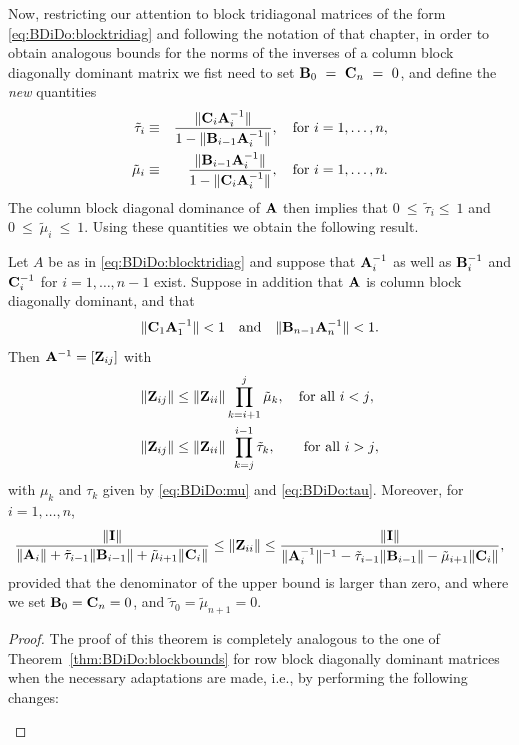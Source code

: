 \begin{subappendices}
Now, restricting our attention to block tridiagonal matrices of the form
\eqref{eq:BDiDo:blocktridiag} and following the notation of that chapter, in
order to obtain analogous bounds for the norms of the inverses of a column
block diagonally dominant matrix we fist need to set $\mathbf{B}_0~=~\mathbf{C}_n~=~0$, and
define the \emph{new} quantities
%
\begin{eqnarray*}
\tilde{\tau}_i   &\equiv& \frac{\|\mathbf{C}_i\mathbf{A}_i^{-1}\|}{1-\|\mathbf{B}_{i-1}\mathbf{A}_i^{-1}\|},
\quad \text{for $i=1,\ldots,n$}, \\
\tilde{\mu}_i &\equiv& \frac{\|\mathbf{B}_{i-1}\mathbf{A}_i^{-1}\|}{1-\|\mathbf{C}_{i}\mathbf{A}_i^{-1}\|},
\quad \text{for $i=1,\ldots,n$}.
\end{eqnarray*}
%
The column block diagonal dominance of $\mathbf{A}$ then implies that
$0~\leq ~\tilde{\tau}_i\leq~1$ and $0~\leq~\tilde{\mu}_i~\leq~1$.
Using these quantities we obtain the following result.
%
\begin{thm}
Let $A$  be as in \eqref{eq:BDiDo:blocktridiag} and suppose that
$\mathbf{A}_i^{-1}$ as well as $\mathbf{B}_i^{-1}$ and $\mathbf{C}_i^{-1}$ for $i=1,\ldots,n-1$ exist.
Suppose in addition that $\mathbf{A}$ is column block diagonally dominant, and that
%
\begin{equation}\label{eq:app:blktridom_b}
\|\mathbf{C}_1\mathbf{A}_1^{-1}\|<1 \quad \mbox{and} \quad \|\mathbf{B}_{n-1}\mathbf{A}_n^{-1}\|<1.
\end{equation}
%
Then $\mathbf{A}^{-1}=[\mathbf{Z}_{ij}]$ with
%
\begin{align}
\|\mathbf{Z}_{ij}\| & \leq  \|\mathbf{Z}_{ii}\| \prod_{k=i+1}^{j}\tilde{\mu}_k,
\quad\text{for all $i<j$}, \label{eq:app:offdiagbound1}\\
\|\mathbf{Z}_{ij}\| & \leq  \|\mathbf{Z}_{ii}\|\;\,\prod_{k=j}^{i-1}\tilde{\tau}_k,
\qquad\text{for all $i>j$},\label{eq:app:offdiagbound2}
\end{align}
%
with $\mu_k$ and $\tau_k$ given by \eqref{eq:BDiDo:mu} and \eqref{eq:BDiDo:tau}. Moreover, for $i=1,\dots,n$,
%
\begin{equation}\label{eq:app:diagbounds}
\frac{\|\mathbf{I}\|}
{\|\mathbf{A}_i\|+\tilde{\tau}_{i-1}\|\mathbf{B}_{i-1}\|+\tilde{\mu}_{i+1}\|\mathbf{C}_{i}\|}
\leq
\|\mathbf{Z}_{ii}\|
\leq
\frac{\|\mathbf{I}\|}
{\|\mathbf{A}_i^{-1}\|^{-1}-\tilde{\tau}_{i-1}\|\mathbf{B}_{i-1}\|-\tilde{\mu}_{i+1}\|\mathbf{C}_i\|},
\end{equation}
%
provided that the denominator of the upper bound is larger than zero,
and where we set $\mathbf{B}_0=\mathbf{C}_n=0$, and $\tilde{\tau}_0=\tilde{\mu}_{n+1}=0$.
\end{thm}

\begin{proof}
The proof of this theorem is completely analogous to the one of
Theorem~\ref{thm:BDiDo:blockbounds} for row block diagonally dominant matrices
when the necessary adaptations are made, i.e., by performing the following
changes:
%
\begin{itemize}


\end{itemize}
\end{proof}
\end{subappendices}
